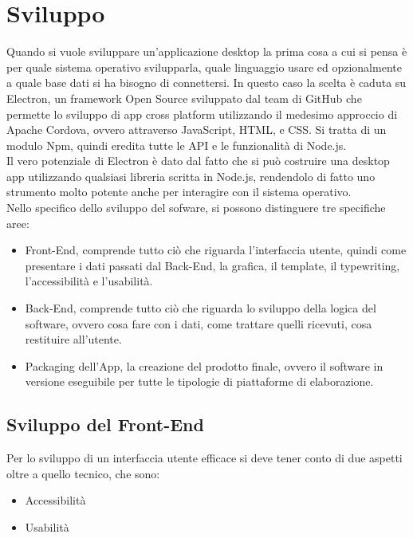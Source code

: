 
\chapter{Sviluppo}

Quando si vuole sviluppare un’applicazione desktop la prima cosa a cui si pensa è per quale sistema operativo svilupparla, quale linguaggio usare ed opzionalmente a quale base dati si ha bisogno di connettersi.
In questo caso la scelta è caduta su Electron, un framework Open Source sviluppato dal team di GitHub che permette lo sviluppo di app cross platform utilizzando il medesimo approccio di Apache Cordova, ovvero attraverso JavaScript, HTML, e CSS.
Si tratta di un modulo Npm, quindi eredita tutte le API e le funzionalità di Node.js.
\\
Il vero potenziale di Electron è dato dal fatto che si può costruire una desktop app utilizzando qualsiasi libreria scritta in Node.js, rendendolo di fatto uno strumento molto potente anche per interagire con il sistema operativo.
\\
Nello specifico dello sviluppo del sofware, si possono distinguere tre specifiche aree:
\begin{itemize}
	\item Front-End, comprende tutto ciò che riguarda l'interfaccia utente, quindi come presentare i dati passati dal Back-End, la grafica, il template, il typewriting, l’accessibilità e l’usabilità.
	\item Back-End, comprende tutto ciò che riguarda lo sviluppo della logica del software, ovvero cosa fare con i dati, come trattare quelli ricevuti, cosa restituire all'utente.
	\item Packaging dell'App, la creazione del prodotto finale, ovvero il software in versione eseguibile per tutte le tipologie di piattaforme di elaborazione.
\end{itemize}



\section{Sviluppo del Front-End}

Per lo sviluppo di un interfaccia utente efficace si deve tener conto di due aspetti oltre a quello tecnico, che sono:
\begin{itemize}
\item Accessibilità
\item Usabilità
\end{itemize}


